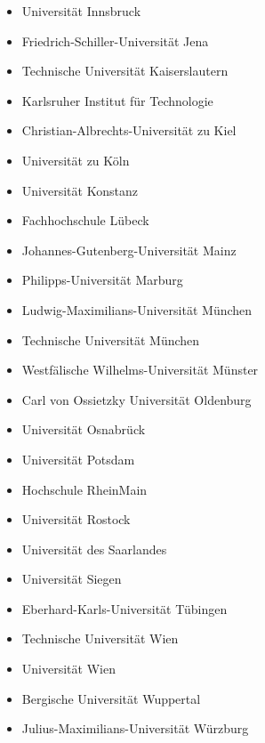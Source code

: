 \begin{itemize}
    \item Universität Innsbruck
    \item Friedrich-Schiller-Universität Jena
    \item Technische Universität Kaiserslautern
    \item Karlsruher Institut für Technologie
    \item Christian-Albrechts-Universität zu Kiel
    \item Universität zu Köln
    \item Universität Konstanz
    \item Fachhochschule Lübeck
    \item Johannes-Gutenberg-Universität Mainz
    \item Philipps-Universität Marburg
    \item Ludwig-Maximilians-Universität München
    \item Technische Universität München
    \item Westfälische Wilhelms-Universität Münster
    \item Carl von Ossietzky Universität Oldenburg
    \item Universität Osnabrück
    \item Universität Potsdam
    \item Hochschule RheinMain
    \item Universität Rostock
    \item Universität des Saarlandes
    \item Universität Siegen
    \item Eberhard-Karls-Universität Tübingen
    \item Technische Universität Wien
    \item Universität Wien
    \item Bergische Universität Wuppertal
    \item Julius-Maximilians-Universität Würzburg
  \end{itemize}
